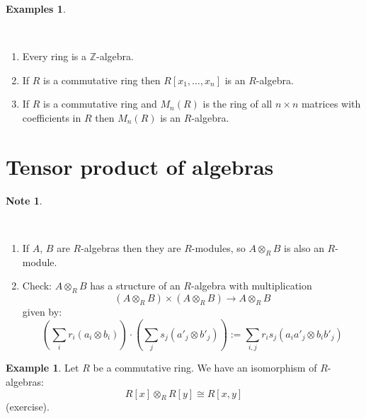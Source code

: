 \documentclass[12pt, letterpaper, oneside]{article}
\theoremstyle{plain}
\theoremstyle{definition}
\newtheorem{example}[theorem]{Example}
\newtheorem{examples}[theorem]{Examples}
\newtheorem{note}[theorem]{Note}
\newcommand{\lra}{\longrightarrow}
\newcommand{\Z}{{\mathbb Z}}
\newcommand{\benu}{\begin{enumerate}}
\newcommand{\eenu}{\end{enumerate}}
\newcommand{\vs}{\vskip 5mm}
\newcommand{\isep}[1][0]{\setlength{\itemsep}{#1 mm}}
\begin{document}
\vs\vs


\begin{examples}\ 

\vskip -13mm
\ 
\benu
\isep[5]
\item Every ring is a $\Z$-algebra.
\item If $R$ is a commutative ring then $R[x_{1}, \dots, x_{n}]$ is an 
$R$-algebra. 
\item If $R$ is a commutative ring and $M_{n}(R)$ is the ring of all $n\times n$
matrices with coefficients in $R$ then $M_{n}(R)$ is an $R$-algebra. 
\eenu 



\end{examples}










\newpage
\section{Tensor product of algebras}
\label{SEC_TENSPRODALGEBRAS}


\begin{note}\ 

\vskip -13mm
\ 
\benu
\item If $A$, $B$ are $R$-algebras then they are $R$-modules, so $A\otimes_{R} B$
is also an $R$-module. 
\item Check: $A\otimes_{R} B$ has a structure of an $R$-algebra with multiplication
$$(A\otimes_{R} B) \times (A\otimes_{R} B) \lra A\otimes_{R} B$$ 
given by:
$$
\left(\sum_{i}r_{i}(a_{i}\otimes b_{i})\right)\cdot \left(\sum_{j}s_{j}(a'_{j}\otimes b'_{j})\right):= 
\sum_{i, j} r_{i}s_{j}(a_{i}a'_{j}\otimes b_{i}b'_{j})
$$
\eenu
 
\end{note}

\vs\vs

\begin{example}
Let $R$ be a commutative ring. We have an isomorphism of $R$-algebras:
$$R[x]\otimes_{R}R[y] \cong R[x, y]$$
(exercise).
\end{example}




\end{document}
